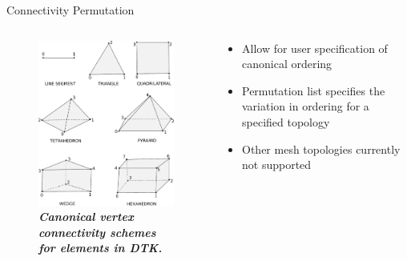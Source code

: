 \documentclass{beamer}
\begin{document}
\begin{frame}{Connectivity Permutation}

  \begin{columns}
    
    \begin{column}{0.5\textwidth}
      \begin{figure}[htpb!]
        \centering
        \includegraphics[width=2.2in]{Linear_Elements.pdf}
        \caption{\bf \sl Canonical vertex connectivity schemes for elements
          in DTK.}
        \label{fig:linear_elements}
      \end{figure}
    \end{column}

    \begin{column}{0.5\textwidth}
      \begin{itemize}
        \item Allow for user specification of canonical ordering
          \medskip
        \item Permutation list specifies the variation in ordering for
          a specified topology
          \medskip
        \item Other mesh topologies currently not supported
      \end{itemize}
    \end{column}

  \end{columns}


\end{frame}
\end{document}
